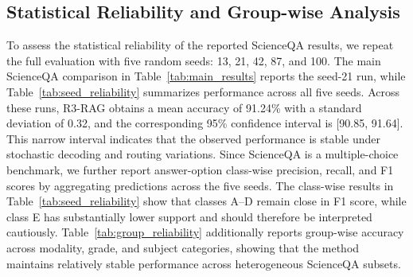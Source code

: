 \documentclass[a4paper, fleqn]{cas-dc}
\begin{document}
\subsection{Statistical Reliability and Group-wise Analysis}\label{sec:statistical_reliability}
To assess the statistical reliability of the reported ScienceQA results, we repeat the full evaluation with five random seeds: 13, 21, 42, 87, and 100.
The main ScienceQA comparison in Table~\ref{tab:main_results} reports the seed-21 run, while Table~\ref{tab:seed_reliability} summarizes performance across all five seeds. Across these runs, R3-RAG obtains a mean accuracy of 91.24\% with a standard deviation of 0.32, and the corresponding 95\% confidence interval is [90.85, 91.64].
This narrow interval indicates that the observed performance is stable under stochastic decoding and routing variations.
Since ScienceQA is a multiple-choice benchmark, we further report answer-option class-wise precision, recall, and F1 scores by aggregating predictions across the five seeds.
The class-wise results in Table~\ref{tab:seed_reliability} show that classes A--D remain close in F1 score, while class E has substantially lower support and should therefore be interpreted cautiously.
Table~\ref{tab:group_reliability} additionally reports group-wise accuracy across modality, grade, and subject categories, showing that the method maintains relatively stable performance across heterogeneous ScienceQA subsets.
\end{document}
